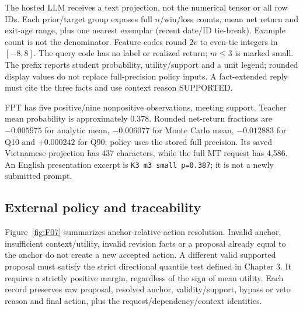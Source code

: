 The hosted LLM receives a text projection, not the numerical tensor or
all row IDs. Each prior/target group exposes full $n$/win/loss counts,
mean net return and exit-age range, plus one nearest exemplar (recent
date/ID tie-break). Example count is not the denominator. Feature codes
round $2v$ to even-tie integers in $[-8,8]$. The query code has no label
or realized return; $m\le3$ is marked small. The prefix reports student
probability, utility/support and a unit legend; rounded display values
do not replace full-precision policy inputs. A fact-extended reply must
cite the three facts and use context reason SUPPORTED.

FPT has five positive/nine nonpositive observations, meeting support.
Teacher mean probability is approximately 0.378. Rounded net-return
fractions are $-0.005975$ for analytic mean, $-0.006077$ for Monte Carlo
mean, $-0.012883$ for Q10 and $+0.000242$ for Q90; policy uses the
stored full precision. Its saved Vietnamese projection has 437 characters, while
the full MT request has 4,586. An English presentation excerpt is
\texttt{K3 m3 small p=0.387}; it is not a newly submitted prompt.

\subsection{External policy and traceability}\label{s:9b835e651fec3c25}
Figure~\ref{fig:F07} summarizes anchor-relative action resolution. Invalid
anchor, insufficient context/utility, invalid revision facts or a proposal
already equal to the anchor do not create a new accepted action. A
different valid supported proposal must satisfy the strict directional
quantile test defined in Chapter 3. It requires a strictly positive
margin, regardless of the sign of mean utility. Each record preserves raw proposal,
resolved anchor, validity/support, bypass or veto reason and final action,
plus the request/dependency/context identities.

